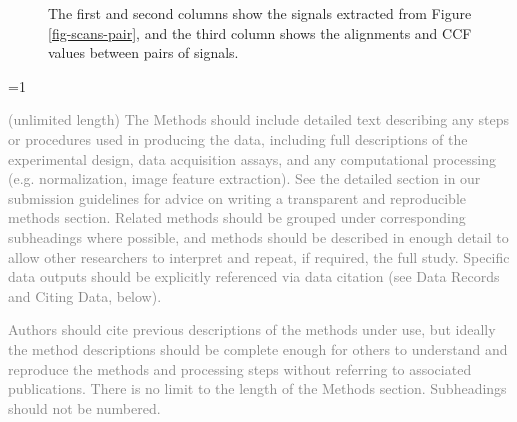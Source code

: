 \documentclass[fleqn,10pt]{wlscirep}
\newcommand{\ifinstruction}{0} %
\begin{document}
\begin{figure}


\caption{\label{fig-signals-pair-alignment}The first and second columns
show the signals extracted from Figure \ref{fig-scans-pair}, and the
third column shows the alignments and CCF values between pairs of
signals.}

\end{figure}%

\ifnum \ifinstruction=1

\textcolor{gray}{(unlimited length) The Methods should include detailed text describing any steps or procedures used in producing the data, including full descriptions of the experimental design, data acquisition assays, and any computational processing (e.g. normalization, image feature extraction). See the detailed section in our submission guidelines for advice on writing a transparent and reproducible methods section. Related methods should be grouped under corresponding subheadings where possible, and methods should be described in enough detail to allow other researchers to interpret and repeat, if required, the full study. Specific data outputs should be explicitly referenced via data citation (see Data Records and Citing Data, below).}

\textcolor{gray}{Authors should cite previous descriptions of the methods under use, but ideally the method descriptions should be complete enough for others to understand and reproduce the methods and processing steps without referring to associated publications. There is no limit to the length of the Methods section. Subheadings should not be numbered.}
\end{document}
